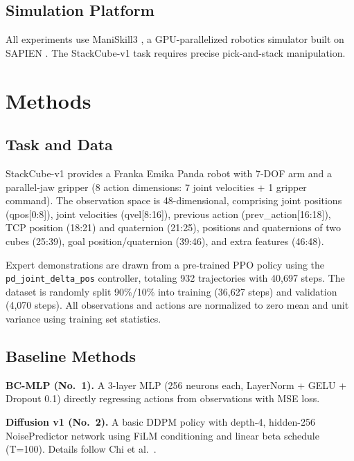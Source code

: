 \documentclass[twocolumn]{article}
\begin{document}
\subsection{Simulation Platform}
All experiments use ManiSkill3 \cite{tao2025maniskill3}, a GPU-parallelized robotics simulator built on SAPIEN \cite{xu2021sapien}. The StackCube-v1 task requires precise pick-and-stack manipulation.

\section{Methods}

\subsection{Task and Data}
\label{sec:task-data}

StackCube-v1 provides a Franka Emika Panda robot with 7-DOF arm and a parallel-jaw gripper (8 action dimensions: 7 joint velocities + 1 gripper command). The observation space is 48-dimensional, comprising joint positions (qpos[0:8]), joint velocities (qvel[8:16]), previous action (prev\_action[16:18]), TCP position (18:21) and quaternion (21:25), positions and quaternions of two cubes (25:39), goal position/quaternion (39:46), and extra features (46:48).

Expert demonstrations are drawn from a pre-trained PPO policy using the \texttt{pd\_joint\_delta\_pos} controller, totaling 932 trajectories with 40,697 steps. The dataset is randomly split 90\%/10\% into training (36,627 steps) and validation (4,070 steps). All observations and actions are normalized to zero mean and unit variance using training set statistics.

\subsection{Baseline Methods}

\noindent\textbf{BC-MLP (No.~1).} A 3-layer MLP (256 neurons each, LayerNorm + GELU + Dropout 0.1) directly regressing actions from observations with MSE loss.

\noindent\textbf{Diffusion v1 (No.~2).} A basic DDPM policy with depth-4, hidden-256 NoisePredictor network using FiLM conditioning and linear beta schedule (T=100). Details follow Chi et al.\ \cite{chi2023diffusion}.
\end{document}
